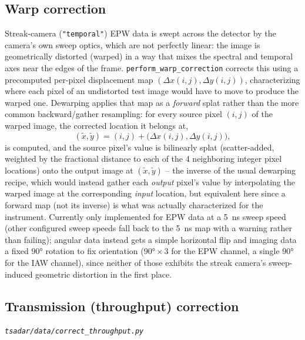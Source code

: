 \documentclass[11pt]{article}
\newcommand{\code}[1]{\texttt{#1}}
\newcommand{\file}[1]{\texttt{#1}}
\begin{document}
\subsection{Warp correction}\label{sec:warp}

Streak-camera (\code{"temporal"}) EPW data is swept across the detector by the camera's own
sweep optics, which are not perfectly linear: the image is geometrically distorted (warped)
in a way that mixes the spectral and temporal axes near the edges of the frame.
\code{perform\_warp\_correction} corrects this using a precomputed per-pixel displacement
map $(\Delta x(i,j),\Delta y(i,j))$, characterizing where each pixel of an undistorted test
image would have to move to produce the warped one. Dewarping applies that map as a
\emph{forward} splat rather than the more common backward/gather resampling: for every
source pixel $(i,j)$ of the warped image, the corrected location it belongs at,
\begin{equation}
  (\tilde x,\tilde y) = (i,j) + \big(\Delta x(i,j),\Delta y(i,j)\big),
\end{equation}
is computed, and the source pixel's value is bilinearly splat (scatter-added, weighted by
the fractional distance to each of the 4 neighboring integer pixel locations) onto the
output image at $(\tilde x,\tilde y)$ -- the inverse of the usual dewarping recipe, which
would instead gather each \emph{output} pixel's value by interpolating the warped image at
the corresponding \emph{input} location, but equivalent here since a forward map (not its
inverse) is what was actually characterized for the instrument. Currently only implemented
for EPW data at a 5~ns sweep speed (other configured sweep speeds fall back to the 5~ns map
with a warning rather than failing); angular data instead gets a simple horizontal flip and
imaging data a fixed $90°$ rotation to fix orientation ($90°\times3$ for the EPW channel,
a single $90°$ for the IAW channel), since neither of those exhibits the streak camera's
sweep-induced geometric distortion in the first place.

\subsection{Transmission (throughput) correction}\label{sec:throughput}
\textit{\file{tsadar/data/correct\_throughput.py}}
\end{document}
